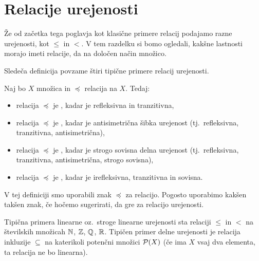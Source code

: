         \section{Relacije urejenosti}\label{RAZDELEK: Relacije urejenosti}

                Že od začetka tega poglavja kot klasične primere relacij podajamo razne urejenosti, kot $\leq$ in $<$. V tem razdelku si bomo ogledali, kakšne lastnosti morajo imeti relacije, da na določen način  množico.

                Sledeča definicija povzame štiri tipične primere relacij urejenosti.

                \begin{definicija}
                        Naj bo $X$ množica in $\preceq$ relacija na $X$. Tedaj:
                        \begin{itemize}
                                \item
                                        relacija $\preceq$ je , kadar je refleksivna in tranzitivna,
                                \item
                                        relacija $\preceq$ je , kadar je antisimetrična šibka urejenost (tj.~refleksivna, tranzitivna, antisimetrična),
                                \item
                                        relacija $\preceq$ je , kadar je strogo sovisna delna urejenost (tj.~refleksivna, tranzitivna, antisimetrična, strogo sovisna),
                                \item
                                        relacija $\preceq$ je , kadar je irefleksivna, tranzitivna in sovisna.
                        \end{itemize}
                \end{definicija}

                V tej definiciji smo uporabili znak $\preceq$ za relacijo. Pogosto uporabimo kakšen takšen znak, če hočemo sugerirati, da gre za relacijo urejenosti.

                Tipična primera linearne oz.~stroge linearne urejenosti sta relaciji $\leq$ in $<$ na številskih množicah $\mathbb{N}$, $\mathbb{Z}$, $\mathbb{Q}$, $\mathbb{R}$. Tipičen primer delne urejenosti je relacija inkluzije $\subseteq$ na katerikoli potenčni množici $\mathcal{P}(X)$ (če ima $X$ vsaj dva elementa, ta relacija ne bo linearna).

